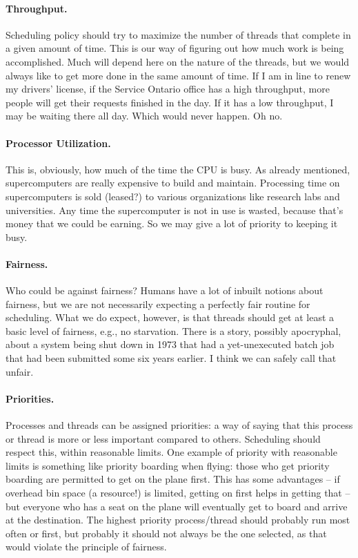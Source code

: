 \paragraph{Throughput.} Scheduling policy should try to maximize the number of threads that complete in a given amount of time. This is our way of figuring out how much work is being accomplished. Much will depend here on the nature of the threads, but we would always like to get more done in the same amount of time. If I am in line to renew my drivers' license, if the Service Ontario office has a high throughput, more people will get their requests finished in the day. If it has a low throughput, I may be waiting there all day. Which would never happen. Oh no.

\paragraph{Processor Utilization.} This is, obviously, how much of the time the CPU is busy. As already mentioned, supercomputers are really expensive to build and maintain. Processing time on supercomputers is sold (leased?) to various organizations like research labs and universities. Any time the supercomputer is not in use is wasted, because that's money that we could be earning. So we may give a lot of priority to keeping it busy.

\paragraph{Fairness.} Who could be against fairness? Humans have a lot of inbuilt notions about fairness, but we are not necessarily expecting a perfectly fair routine for scheduling. What we do expect, however, is that threads should get at least a basic level of fairness, e.g., no starvation. There is a story, possibly apocryphal, about a system being shut down in 1973 that had a yet-unexecuted batch job that had been submitted some six years earlier. I think we can safely call that unfair.

\paragraph{Priorities.} Processes and threads can be assigned priorities: a way of saying that this process or thread is more or less important compared to others. Scheduling should respect this, within reasonable limits. One example of priority with reasonable limits is something like priority boarding when flying: those who get priority boarding are permitted to get on the plane first. This has some advantages -- if overhead bin space (a resource!) is limited, getting on first helps in getting that -- but everyone who has a seat on the plane will eventually get to board and arrive at the destination.  The highest priority process/thread should probably run most often or first, but probably it should not always be the one selected, as that would violate the principle of fairness.

